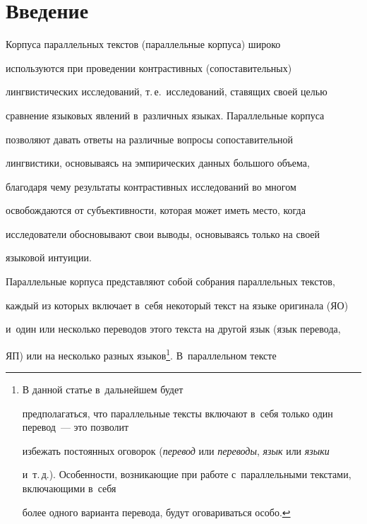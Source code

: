  


 \vspace*{-12pt}


    


\section{Введение}





\vspace*{-3pt}





   Корпуса параллельных текстов (параллельные корпуса) широко 


используются при проведении контрастивных (сопоставительных) 


лингвистических исследований, т.\,е.\ исследований, ставящих своей целью 


сравнение языковых явлений в~различных языках. Параллельные корпуса 


поз\-во\-ля\-ют давать ответы на различные вопросы сопоставительной 


лингвистики, основываясь на эмпирических данных большого объема, 


благодаря чему результаты контрастивных исследований во многом 


освобождаются от субъективности, которая может иметь мес\-то, когда 


исследователи обосновывают свои выводы, основываясь только на своей 


языковой интуиции. 


   


   Параллельные корпуса представляют собой собрания параллельных текс\-тов, 


каждый из которых вклю\-ча\-ет в~себя некоторый текст на языке оригинала (ЯО) 


и~один или несколько переводов этого текс\-та на другой язык (язык перевода, 


ЯП) или на несколько разных языков\footnote{В данной статье в~дальнейшем будет 


предполагаться, что параллельные тексты включают в~себя только один перевод~--- это позволит 


избежать постоянных оговорок (\textit{перевод} или \textit{переводы}, \textit{язык} или \textit{языки} 


и~т.\,д.). Особенности, возникающие при работе с~параллельными текстами, включающими в~себя 


более одного варианта перевода, будут оговариваться особо.}. В~параллельном тексте 


